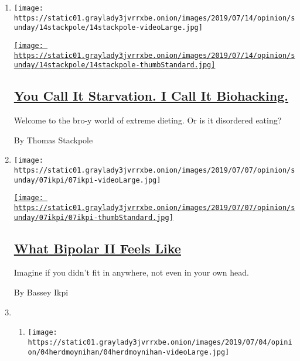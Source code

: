\begin{enumerate}
\def\labelenumi{\arabic{enumi}.}
\item
  \texttt{[image: https://static01.graylady3jvrrxbe.onion/images/2019/07/14/opinion/sunday/14stackpole/14stackpole-videoLarge.jpg]}

  \href{/2019/07/11/opinion/sunday/men-extreme-diets.html}{\texttt{[image: https://static01.graylady3jvrrxbe.onion/images/2019/07/14/opinion/sunday/14stackpole/14stackpole-thumbStandard.jpg]}}

  \hypertarget{you-call-it-starvation-i-call-it-biohacking}{%
  \subsection{\texorpdfstring{\href{/2019/07/11/opinion/sunday/men-extreme-diets.html}{You
  Call It Starvation. I Call It
  Biohacking.}}{You Call It Starvation. I Call It Biohacking.}}\label{you-call-it-starvation-i-call-it-biohacking}}

  Welcome to the bro-y world of extreme dieting. Or is it disordered
  eating?

  By Thomas Stackpole
\item
  \texttt{[image: https://static01.graylady3jvrrxbe.onion/images/2019/07/07/opinion/sunday/07ikpi/07ikpi-videoLarge.jpg]}

  \href{/2019/07/06/opinion/sunday/bipolar-bassey-ikpi-book.html}{\texttt{[image: https://static01.graylady3jvrrxbe.onion/images/2019/07/07/opinion/sunday/07ikpi/07ikpi-thumbStandard.jpg]}}

  \hypertarget{what-bipolar-ii-feels-like}{%
  \subsection{\texorpdfstring{\href{/2019/07/06/opinion/sunday/bipolar-bassey-ikpi-book.html}{What
  Bipolar II Feels
  Like}}{What Bipolar II Feels Like}}\label{what-bipolar-ii-feels-like}}

  Imagine if you didn't fit in anywhere, not even in your own head.

  By Bassey Ikpi
\item
  \begin{enumerate}
  \def\labelenumii{\arabic{enumii}.}
  \item
    \texttt{[image: https://static01.graylady3jvrrxbe.onion/images/2019/07/04/opinion/04herdmoynihan/04herdmoynihan-videoLarge.jpg]}

    \hypertarget{how-to-straighten-out-the-medicare-maze}{%
}
\end{enumerate}
\end{enumerate}
